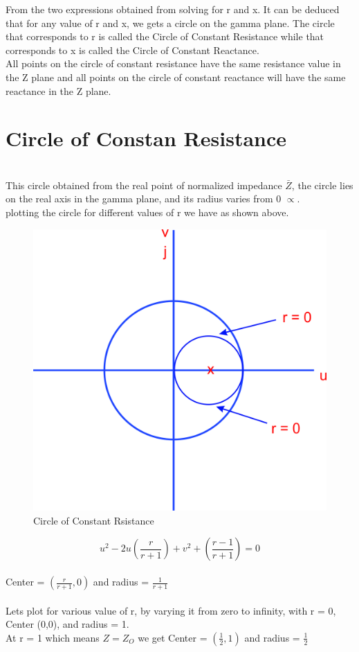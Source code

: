 From the two expressions obtained from solving for r and x.  It can be deduced that for any value of r and x, we gets a circle on the gamma plane. The circle that corresponds to r is called the Circle of Constant Resistance while that corresponds to x is called the Circle of Constant Reactance.\\

All points on the circle of constant resistance have the same resistance value in the Z plane and all points on the  circle of constant reactance will have the same reactance in the Z plane.\\

\section{Circle of Constan Resistance}\\ 
This circle  obtained from the real point of normalized impedance $ \bar{Z} $, the circle lies on the real axis in the gamma plane, and its radius varies from 0 $\propto$.\\ plotting the circle for different values of r we have as shown above.
\begin{figure}[h]
\centering
\includegraphics[width=0.5\linewidth]{./graphics/ouytre}
\caption{Circle of Constant Rsistance}
\label{fig:ouytre}
\end{figure}
\begin{equation*}
u^2 - 2u(\frac{r}{r + 1}) + v^2 +(\frac{r - 1}{r + 1}) = 0
\end{equation*}\\
 Center = $(\frac{r}{r + 1},0)$ and radius = $\frac{1}{r + 1}$\\\\
Lets plot for various value of r, by varying it from zero to infinity, with r = 0, Center (0,0), and radius = 1.\\
At r = 1 which means $Z = Z_O$ we get  Center = $(\frac{1}{2},1)$ and radius = $\frac{1}{2}$\\
